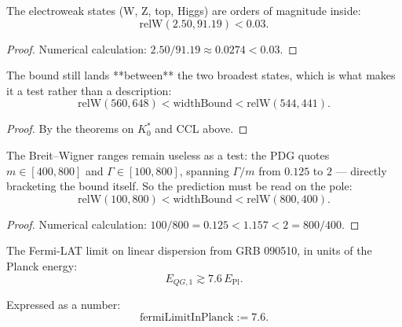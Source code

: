 \begin{theorem}
The electroweak states (W, Z, top, Higgs) are orders of magnitude inside:
\begin{equation}
\text{relW}(2.50, 91.19) < 0.03.
\end{equation}
\begin{proof}
Numerical calculation: $2.50/91.19 \approx 0.0274 < 0.03$.
\end{proof}
\end{theorem}

\begin{theorem}
The bound still lands **between** the two broadest states, which is what makes it a test rather than a description:
\begin{equation}
\text{relW}(560, 648) < \text{widthBound} < \text{relW}(544, 441).
\end{equation}
\begin{proof}
By the theorems on $K_0^*$ and CCL above.
\end{proof}
\end{theorem}

\begin{theorem}
The Breit–Wigner ranges remain useless as a test: the PDG quotes $m \in [400, 800]$ and $\Gamma \in [100, 800]$, spanning $\Gamma/m$ from $0.125$ to $2$ — directly bracketing the bound itself.  So the prediction must be read on the pole:
\begin{equation}
\text{relW}(100, 800) < \text{widthBound} < \text{relW}(800, 400).
\end{equation}
\begin{proof}
Numerical calculation: $100/800 = 0.125 < 1.157 < 2 = 800/400$.
\end{proof}
\end{theorem}

\begin{definition}
The Fermi-LAT limit on linear dispersion from GRB 090510, in units of the Planck energy:
\begin{equation}
E_{QG,1} \gtrsim 7.6 \, E_{\text{Pl}}.
\end{equation}

Expressed as a number:
\begin{equation}
\text{fermiLimitInPlanck} := 7.6.
\end{equation}
\end{definition}

